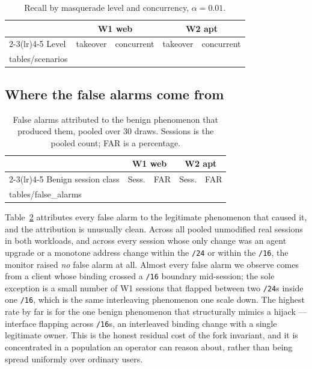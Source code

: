 \documentclass[conference]{IEEEtran}
\makeatletter
\newcommand{\tabbody}[1]{\@@input #1 }
\makeatother
\begin{document}
\begin{table}[t]
\caption{Recall by masquerade level and concurrency, $\alpha=0.01$.}
\label{tab:scenarios}
\centering\footnotesize
\begin{tabular}{lrrrr}
\toprule
& \multicolumn{2}{c}{W1 web} & \multicolumn{2}{c}{W2 apt}\\
\cmidrule(lr){2-3}\cmidrule(lr){4-5}
Level & takeover & concurrent & takeover & concurrent\\
\midrule
\tabbody{tables/scenarios}
\bottomrule
\end{tabular}
\end{table}

\subsection{Where the false alarms come from}

\begin{table}[t]
\caption{False alarms attributed to the benign phenomenon that produced them,
pooled over $30$ draws. Sessions is the pooled count; FAR is a percentage.}
\label{tab:falsealarms}
\centering\footnotesize
\begin{tabular}{lrrrr}
\toprule
& \multicolumn{2}{c}{W1 web} & \multicolumn{2}{c}{W2 apt}\\
\cmidrule(lr){2-3}\cmidrule(lr){4-5}
Benign session class & Sess. & FAR & Sess. & FAR\\
\midrule
\tabbody{tables/false_alarms}
\bottomrule
\end{tabular}
\end{table}

Table~\ref{tab:falsealarms} attributes every false alarm to the legitimate
phenomenon that caused it, and the attribution is unusually clean.  Across all
pooled unmodified real sessions in both workloads, and across every session whose
only change was an agent upgrade or a monotone address change within the
\texttt{/24} or within the \texttt{/16}, the monitor raised \emph{no} false
alarm at all.  Almost every false alarm we observe comes from a client whose
binding crossed a \texttt{/16} boundary mid-session; the sole exception is a
small number of W1 sessions that flapped between two \texttt{/24}s inside one
\texttt{/16}, which is the same interleaving phenomenon one scale down.  The
highest rate by far is for the one benign phenomenon that structurally mimics a
hijack --- interface flapping across \texttt{/16}s, an interleaved binding change
with a single legitimate
owner.  This is the honest residual cost of the fork invariant, and it is
concentrated in a population an operator can reason about, rather than being
spread uniformly over ordinary users.
\end{document}
